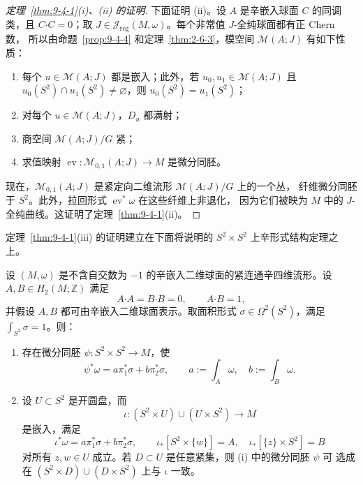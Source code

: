 \begin{proof}[定理~\ref{thm:9-4-1}(i)、(ii) 的证明]
下面证明 (ii)。设 $A$ 是辛嵌入球面 $C$ 的同调类，且
$C\mathbin{\boldsymbol\cdot}C=0$；取
$J\in\mathcal J_{\mathrm{reg}}(M,\omega)$。每个非常值 $J$-全纯球面都有正 Chern 数，
所以由命题~\ref{prop:9-4-4} 和定理~\ref{thm:2-6-3}，模空间
$\mathcal M(A;J)$ 有如下性质：
\begin{enumerate}[label=(\alph*),leftmargin=3em]
\item 每个 $u\in\mathcal M(A;J)$ 都是嵌入；此外，若
$u_0,u_1\in\mathcal M(A;J)$ 且
$u_0(S^2)\cap u_1(S^2)\ne\varnothing$，则
$u_0(S^2)=u_1(S^2)$；
\item 对每个 $u\in\mathcal M(A;J)$，$D_u$ 都满射；
\item 商空间 $\mathcal M(A;J)/G$ 紧；
\item {}求值映射
$\operatorname{ev}:\mathcal M_{0,1}(A;J)\to M$ 是微分同胚。
\end{enumerate}
现在，$\mathcal M_{0,1}(A;J)$ 是紧定向二维流形 $\mathcal M(A;J)/G$ 上的一个丛，
纤维微分同胚于 $S^2$。此外，拉回形式 $\operatorname{ev}^*\omega$ 在这些纤维上非退化，
因为它们被映为 $M$ 中的 $J$-全纯曲线。这证明了定理~\ref{thm:9-4-1}(ii)。
\end{proof}

定理~\ref{thm:9-4-1}(iii) 的证明建立在下面将说明的
$S^2\times S^2$ 上辛形式结构定理之上。

\begin{theorem}\label{thm:9-4-7}
设 $(M,\omega)$ 是不含自交数为 $-1$ 的辛嵌入二维球面的紧连通辛四维流形。设
$A,B\in H_2(M;\mathbb Z)$ 满足
\[
  A\mathbin{\boldsymbol\cdot}A=B\mathbin{\boldsymbol\cdot}B=0,
  \qquad
  A\mathbin{\boldsymbol\cdot}B=1,
\]
并假设 $A,B$ 都可由辛嵌入二维球面表示。取面积形式
$\sigma\in\Omega^2(S^2)$，满足 $\int_{S^2}\sigma=1$。则：
\begin{enumerate}[label=(\roman*),leftmargin=3em]
\item 存在微分同胚 $\psi:S^2\times S^2\to M$，使
\[
  \psi^*\omega=a\pi_1^*\sigma+b\pi_2^*\sigma,
  \qquad
  a:=\int_A\omega,
  \quad
  b:=\int_B\omega.
\]
\item 设 $U\subset S^2$ 是开圆盘，而
\[
  \iota:(S^2\times U)\cup(U\times S^2)\longrightarrow M
\]
是嵌入，满足
\[
  \iota^*\omega=a\pi_1^*\sigma+b\pi_2^*\sigma,
  \qquad
  \iota_*[S^2\times\{w\}]=A,
  \quad
  \iota_*[\{z\}\times S^2]=B
\]
对所有 $z,w\in U$ 成立。若 $D\subset U$ 是任意紧集，则 (i) 中的微分同胚 $\psi$ 可
选成在 $(S^2\times D)\cup(D\times S^2)$ 上与 $\iota$ 一致。
\end{enumerate}
\end{theorem}

